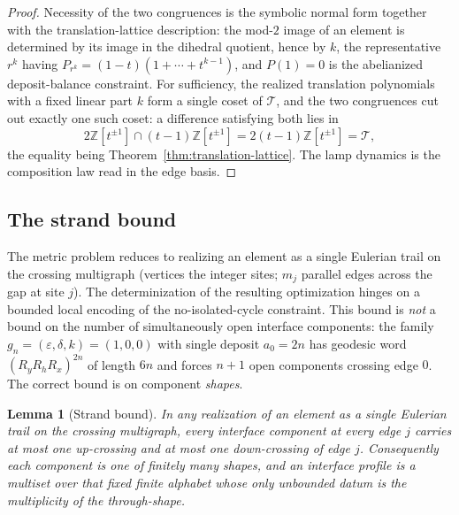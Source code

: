 \documentclass[11pt]{article}
\theoremstyle{plain}
\newtheorem{lemma}[theorem]{Lemma}
\theoremstyle{definition}
\theoremstyle{remark}
\begin{document}
\begin{proof}
Necessity of the two congruences is the symbolic normal form together with the
translation-lattice description: the mod-$2$ image of an element is determined
by its image in the dihedral quotient, hence by $k$, the representative $r^k$
having $P_{r^k}=(1-t)(1+\cdots+t^{k-1})$, and $P(1)=0$ is the abelianized
deposit-balance constraint. For sufficiency, the realized translation
polynomials with a fixed linear part $k$ form a single coset of $\mathcal{T}$,
and the two congruences cut out exactly one such coset: a difference satisfying
both lies in
\[
2\mathbb{Z}[t^{\pm1}]\cap(t-1)\mathbb{Z}[t^{\pm1}]
=2(t-1)\mathbb{Z}[t^{\pm1}]=\mathcal{T},
\]
the equality being Theorem~\ref{thm:translation-lattice}. The lamp dynamics is
the composition law read in the edge basis.
\end{proof}

\subsection{The strand bound}

The metric problem reduces to realizing an element as a single Eulerian trail
on the crossing multigraph (vertices the integer sites; $m_j$ parallel edges
across the gap at site $j$). The determinization of the resulting optimization
hinges on a bounded local encoding of the no-isolated-cycle constraint. This
bound is \emph{not} a bound on the number of simultaneously open interface
components: the family $g_n=(\varepsilon,\delta,k)=(1,0,0)$ with single deposit
$a_0=2n$ has geodesic word $(R_yR_hR_x)^{2n}$ of length $6n$ and forces $n+1$
open components crossing edge $0$. The correct bound is on component
\emph{shapes}.

\begin{lemma}[Strand bound]
\label{lem:strand-bound}
In any realization of an element as a single Eulerian trail on the crossing
multigraph, every interface component at every edge $j$ carries at most one
up-crossing and at most one down-crossing of edge $j$. Consequently each
component is one of finitely many shapes, and an interface profile is a
multiset over that fixed finite alphabet whose only unbounded datum is
the multiplicity of the through-shape.
\end{lemma}
\end{document}
